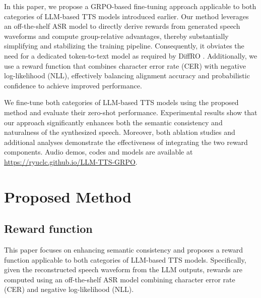 \documentclass{article}
\begin{document}
In this paper, we propose a GRPO-based fine-tuning approach applicable to both categories of LLM-based TTS models introduced earlier. Our method leverages an off-the-shelf ASR model to directly derive rewards from generated speech waveforms and compute group-relative advantages, thereby substantially simplifying and stabilizing the training pipeline. Consequently, it obviates the need for a dedicated token-to-text model as required by DiffRO \cite{diffro}.
Additionally, we use a reward function that combines character error rate (CER) with negative log-likelihood (NLL), effectively balancing alignment accuracy and probabilistic confidence to achieve improved performance.

We fine-tune both categories of LLM-based TTS models using the proposed method and evaluate their zero-shot performance. Experimental results show that our approach significantly enhances both the semantic consistency and naturalness of the synthesized speech. Moreover, both ablation studies and additional analyses demonstrate the effectiveness of integrating the two reward components. Audio demos, codes and models are available at \url{https://ryuclc.github.io/LLM-TTS-GRPO}.

\vspace{-0.2cm}
\section{Proposed Method}
\label{sec:method}

\vspace{-0.2cm}
\subsection{Reward function}
\label{ssec:reward}
\vspace{-0.2cm}

This paper focuses on enhancing semantic consistency and proposes a reward function applicable to both categories of LLM-based TTS models. Specifically, given the reconstructed speech waveform from the LLM outputs, rewards are computed using an off-the-shelf ASR model combining character error rate (CER) and negative log-likelihood (NLL).
\end{document}
